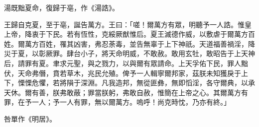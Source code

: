 
\begin{pinyinscope}
湯既黜夏命，復歸于亳，作《湯誥》。

王歸自克夏，至于亳，誕告萬方。王曰：「嗟！爾萬方有眾，明聽予一人誥。惟皇上帝，降衷于下民。若有恆性，克綏厥猷惟后。夏王滅德作威，以敷虐于爾萬方百姓。爾萬方百姓，罹其凶害，弗忍荼毒，並告無辜于上下神祇。天道福善禍淫，降災于夏，以彰厥罪。肆台小子，將天命明威，不敢赦。敢用玄牡，敢昭告于上天神后，請罪有夏。聿求元聖，與之戮力，以與爾有眾請命。上天孚佑下民，罪人黜伏，天命弗僭，賁若草木，兆民允殖。俾予一人輯寧爾邦家，茲朕未知獲戾于上下，慄慄危懼，若將隕于深淵。凡我造邦，無從匪彝，無即慆淫，各守爾典，以承天休。爾有善，朕弗敢蔽；罪當朕躬，弗敢自赦，惟簡在上帝之心。其爾萬方有罪，在予一人；予一人有罪，無以爾萬方。嗚呼！尚克時忱，乃亦有終。」

咎單作《明居》。


\end{pinyinscope}